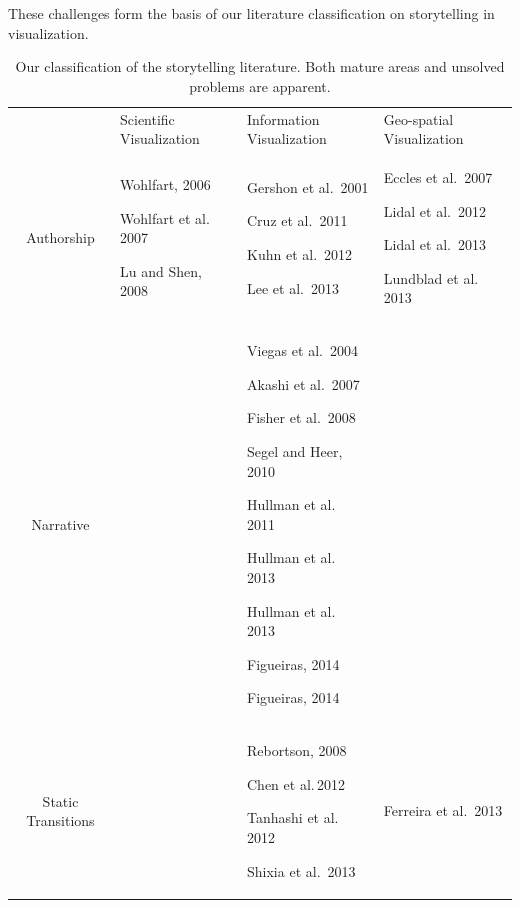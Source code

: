 \documentclass{egpubl}
\begin{document}
These challenges form the basis of our literature classification on storytelling in visualization. 

\begin{table}[htbp]
\centering
\caption{Our classification of the storytelling literature. Both mature areas and unsolved problems are apparent.} 
\centering 
\begin{tabular}{c|| p{4cm}| p{5cm}|p{4cm}} 
 & Scientific Visualization & Information Visualization & Geo-spatial Visualization\\ 
 \hhline{====}
Authorship & Wohlfart, 2006 \cite{wohlfat}\par Wohlfart et al.\, 2007\cite{wohlfart2} \par Lu and Shen, 2008\cite{lu2008interactive} \par & Gershon et al.\, 2001\cite{Gershon2}\par Cruz et al.\, 2011 \cite{cruz2011} \par Kuhn et al.\, 2012\cite{kuhn2012} \par  Lee et al.\, 2013\cite{lee2013} \par & Eccles et al.\, 2007\cite{eccles2007} \par  Lidal et al.\, 2012 \cite{lidal}  \par Lidal et al.\, 2013\cite{Lidal2013} \par Lundblad et al.\, 2013\cite{lundblad2013} \par\\
\hline 
Narrative & & Viegas et al.\, 2004\cite{viegas2004}\par Akashi et al.\, 2007\cite{akaishi2007narrative} \par Fisher et al.\, 2008\cite{fisher} \par Segel and Heer, 2010\cite{segal}\par  Hullman et al.\, 2011\cite{hullman} \par Hullman et al.\, 2013 \cite{hullman2013} \par Hullman et al.\, 2013 \cite{hullman2013deeper} \par Figueiras, 2014 \cite{figueiras} \par Figueiras, 2014 \cite{figueiras2014tell}&\\ 
\hline
Static Transitions & & Rebortson, 2008\cite{Rebortson} \par  Chen et al.\,2012\cite{chen2012visual} \par Tanhashi et al.\, 2012\cite{Tanahashi} \par Shixia et al.\, 2013\cite{shixia} & Ferreira et al.\, 2013\cite{ferreira2013} \par \\ 

\end{tabular}
\end{table}
\end{document}
